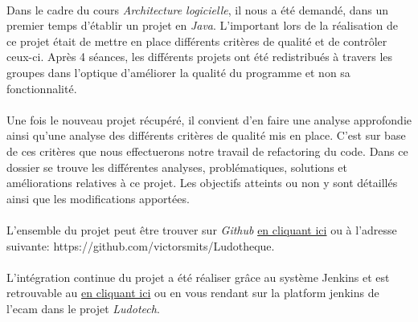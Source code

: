 \paragraph{}
    Dans le cadre du cours \textit{Architecture logicielle}, il nous a été demandé, dans un premier temps d'établir un projet en \textit{Java}. L'important lors de la réalisation de ce projet était de mettre en place différents critères de qualité et de contrôler ceux-ci. Après 4 séances, les différents projets ont été redistribués à travers les groupes dans l'optique d'améliorer la qualité du programme et non sa fonctionnalité.

\paragraph{}
    Une fois le nouveau projet récupéré, il convient d'en faire une analyse approfondie ainsi qu'une analyse des différents critères de qualité mis en place. C'est sur base de ces critères que nous effectuerons notre travail de refactoring du code. Dans ce dossier se trouve les différentes analyses, problématiques, solutions et améliorations relatives à ce projet. Les objectifs atteints ou non y sont détaillés ainsi que les modifications apportées.

\paragraph{}
    L'ensemble du projet peut être trouver sur \textit{Github} \href{https://github.com/victorsmits/Ludotheque}{en cliquant ici} ou à l'adresse suivante: https://github.com/victorsmits/Ludotheque.

\paragraph{}
    L'intégration continue du projet a été réaliser grâce au système Jenkins et est retrouvable au \href{https://jenkins.ecam.be/login}{en cliquant ici} ou en vous rendant sur la platform jenkins de l'ecam dans le projet \textit{Ludotech}.